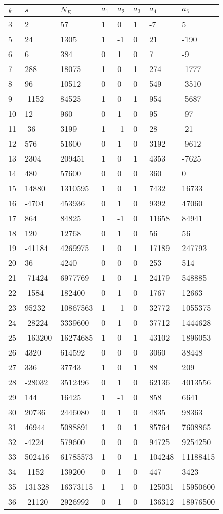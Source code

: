 \documentclass{amsart}
\begin{document}
\begin{longtable}{|l|l|l|lllll|}
\hline
$k$ & $s$ & $N_E$ & $a_1$ & $a_2$ & $a_3$ & $a_4$ & $a_5$\\
\hline
3&2&57&1&0&1&-7&5\\
5&24&1305&1&-1&0&21&-190\\
6&6&384&0&1&0&7&-9\\
7&288&18075&1&0&1&274&-1777\\
8&96&10512&0&0&0&549&-3510\\
9&-1152&84525&1&0&1&954&-5687\\
10&12&960&0&1&0&95&-97\\
11&-36&3199&1&-1&0&28&-21\\
12&576&51600&0&1&0&3192&-9612\\
13&2304&209451&1&0&1&4353&-7625\\
14&480&57600&0&0&0&360&0\\
15&14880&1310595&1&0&1&7432&16733\\
16&-4704&453936&0&1&0&9392&47060\\
17&864&84825&1&-1&0&11658&84941\\
18&120&12768&0&1&0&56&56\\
19&-41184&4269975&1&0&1&17189&247793\\
20&36&4240&0&0&0&253&514\\
21&-71424&6977769&1&0&1&24179&548885\\
22&-1584&182400&0&1&0&1767&12663\\
23&95232&10867563&1&-1&0&32772&1055375\\
24&-28224&3339600&0&1&0&37712&1444628\\
25&-163200&16274685&1&0&1&43102&1896053\\
26&4320&614592&0&0&0&3060&38448\\
27&336&37743&1&0&1&88&209\\
28&-28032&3512496&0&1&0&62136&4013556\\
29&144&16425&1&-1&0&858&6641\\
30&20736&2446080&0&1&0&4835&98363\\
31&46944&5088891&1&0&1&85764&7608865\\
32&-4224&579600&0&0&0&94725&9254250\\
33&502416&61785573&1&0&1&104248&11188415\\
34&-1152&139200&0&1&0&447&3423\\
35&131328&16373115&1&-1&0&125031&15950600\\
36&-21120&2926992&0&1&0&136312&18976500\\

\end{longtable}
\end{document}

